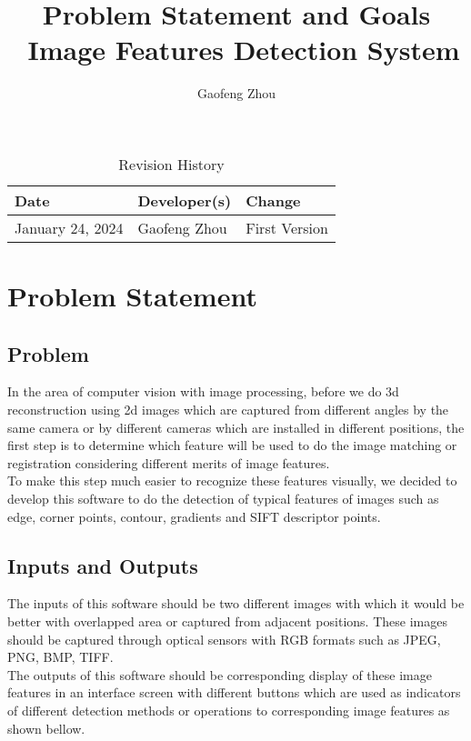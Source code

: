 \documentclass{article}
\title{Problem Statement and Goals\\\ Image Features Detection System}
\author{Gaofeng Zhou}
\date{}
\begin{document}
\maketitle

\begin{table}[hp]
\caption{Revision History} \label{TblRevisionHistory}
\begin{tabularx}{\textwidth}{llX}
\toprule
\textbf{Date} & \textbf{Developer(s)} & \textbf{Change}\\
\midrule
January 24, 2024 & Gaofeng Zhou & First Version\\

\bottomrule
\end{tabularx}
\end{table}

\section{Problem Statement}

\subsection{Problem}

In the area of computer vision with image processing, before we do 3d reconstruction using 2d images which are captured from different angles by the same camera or by different cameras which are installed in different positions, the first step is to determine which feature will be used to do the image matching or registration considering different merits of image
features.\\
To make this step much easier to recognize these features visually, we decided to develop this software to do the detection of typical features of images such as edge, corner points, contour, gradients and SIFT descriptor points.\\


\subsection{Inputs and Outputs}

The inputs of this software should be two different images with which it would be better with overlapped area or captured from adjacent positions. These images should be captured through optical sensors with RGB formats such as JPEG, PNG, BMP, TIFF.\\
The outputs of this software should be corresponding display of these image features in an interface screen with different buttons which are used as indicators of different detection methods or operations to corresponding image features as shown bellow.\\
\end{document}
